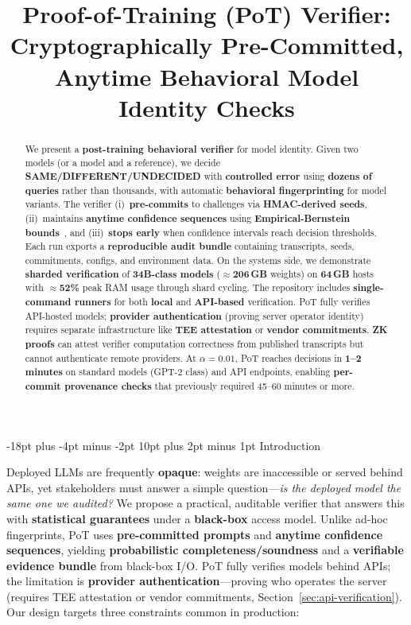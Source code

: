 \documentclass[11pt]{article}
\title{Proof-of-Training (PoT) Verifier: Cryptographically Pre-Committed,\\
Anytime Behavioral Model Identity Checks}
\date{}
\makeatletter
\renewcommand\section{\@startsection{section}{1}{\z@}%
  {-18pt plus -4pt minus -2pt}%
  {10pt plus 2pt minus 1pt}%
  {\normalfont\Large\bfseries}}
\makeatother
\begin{document}
\maketitle

\begin{abstract}
We present a \textbf{post-training behavioral verifier} for model identity. 
Given two models (or a model and a reference), we decide 
\textbf{SAME/DIFFERENT/UNDECIDED} with \textbf{controlled error} using 
\textbf{dozens of queries} rather than thousands, with automatic 
\textbf{behavioral fingerprinting} for model variants. 
The verifier (i)~\textbf{pre-commits} to challenges via \textbf{HMAC-derived seeds}, 
(ii)~maintains \textbf{anytime confidence sequences} using 
\textbf{Empirical-Bernstein bounds}~\cite{maurer2009empiricalbernstein,howard2021timeuniform,howard2021confidenceSequences}, 
and (iii)~\textbf{stops early} when confidence intervals reach decision thresholds. 
Each run exports a \textbf{reproducible audit bundle} containing transcripts, 
seeds, commitments, configs, and environment data. 
On the systems side, we demonstrate \textbf{sharded verification} of 
\textbf{34B-class models} ($\approx$\textbf{206\,GB} weights) on \textbf{64\,GB} hosts 
with $\approx$\textbf{52\%} peak RAM usage through shard cycling. 
The repository includes \textbf{single-command runners} for both \textbf{local} 
and \textbf{API-based} verification. 
PoT fully verifies API-hosted models; \textbf{provider authentication} 
(proving server operator identity) requires separate infrastructure like 
\textbf{TEE attestation} or \textbf{vendor commitments}. 
\textbf{ZK proofs} can attest verifier computation correctness from published 
transcripts but cannot authenticate remote providers. 
At $\alpha=0.01$, PoT reaches decisions in \textbf{1--2 minutes} on standard models 
(GPT-2 class) and API endpoints, enabling \textbf{per-commit provenance checks} 
that previously required 45--60 minutes or more.
\end{abstract}

\section{Introduction}

Deployed LLMs are frequently \textbf{opaque}: weights are inaccessible or served behind APIs, yet stakeholders must answer a simple question---\emph{is the deployed model the same one we audited?} We propose a practical, auditable verifier that answers this with \textbf{statistical guarantees} under a \textbf{black-box} access model. Unlike ad-hoc fingerprints, PoT uses \textbf{pre-committed prompts} and \textbf{anytime confidence sequences}, yielding \textbf{probabilistic completeness/soundness} and a \textbf{verifiable evidence bundle} from black-box I/O\@. PoT fully verifies models behind APIs; the limitation is \textbf{provider authentication}---proving who operates the server (requires TEE attestation or vendor commitments, Section~\ref{sec:api-verification}). Our design targets three constraints common in production:
\end{document}
